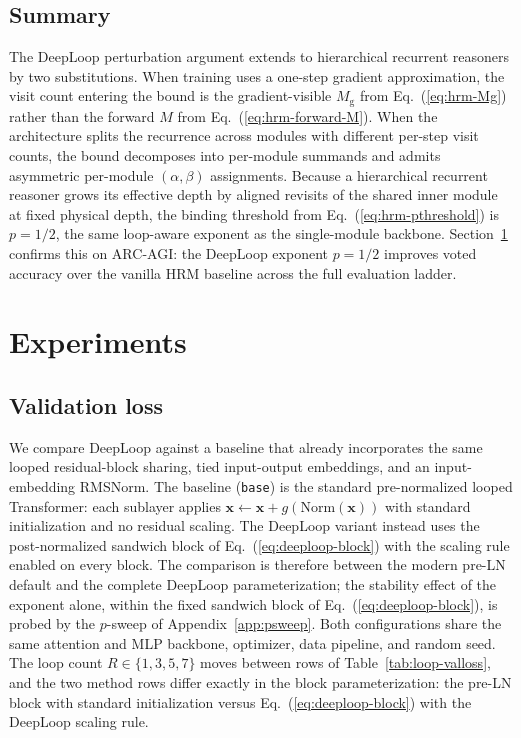 \documentclass[11pt]{airesearch}
\begin{document}
\subsection{Summary}
\label{sec:hrm:summary}

The DeepLoop perturbation argument extends to hierarchical recurrent
reasoners by two substitutions. When training uses a one-step gradient
approximation, the visit count entering the bound is the gradient-visible
$M_{\mathrm{g}}$ from Eq.~(\ref{eq:hrm-Mg}) rather than the forward $M$ from
Eq.~(\ref{eq:hrm-forward-M}). When the architecture splits the recurrence
across modules with different per-step visit counts, the bound decomposes
into per-module summands and admits asymmetric per-module
$(\alpha,\beta)$ assignments. Because a hierarchical recurrent reasoner grows
its effective depth by aligned revisits of the shared inner module at fixed
physical depth, the binding threshold from Eq.~(\ref{eq:hrm-pthreshold}) is
$p=1/2$, the same loop-aware exponent as the single-module backbone.
Section~\ref{sec:experiments} confirms this on ARC-AGI: the DeepLoop exponent
$p=1/2$ improves voted accuracy over the vanilla HRM baseline across the full
evaluation ladder.

\section{Experiments}
\label{sec:experiments}

\subsection{Validation loss}
\label{sec:experiments:valloss}

We compare DeepLoop against a baseline that already incorporates the same
looped residual-block sharing, tied input-output embeddings, and an
input-embedding RMSNorm. The baseline (\texttt{base}) is the standard
pre-normalized looped Transformer: each sublayer applies
$\mathbf{x}\leftarrow\mathbf{x}+g(\mathrm{Norm}(\mathbf{x}))$ with standard
initialization and no residual scaling. The DeepLoop variant instead uses the
post-normalized sandwich block of Eq.~(\ref{eq:deeploop-block}) with the
scaling rule enabled on every block. The comparison is therefore between the
modern pre-LN default and the complete DeepLoop parameterization; the
stability effect of the exponent alone, within the fixed sandwich block of
Eq.~(\ref{eq:deeploop-block}), is probed by the
$p$-sweep of Appendix~\ref{app:psweep}. Both configurations share the same
attention and MLP backbone, optimizer, data pipeline, and random seed. The
loop count $R \in \{1,3,5,7\}$ moves between rows of
Table~\ref{tab:loop-valloss}, and the two method rows differ exactly in the
block parameterization: the pre-LN block with standard initialization versus
Eq.~(\ref{eq:deeploop-block}) with the DeepLoop scaling rule.
\end{document}

